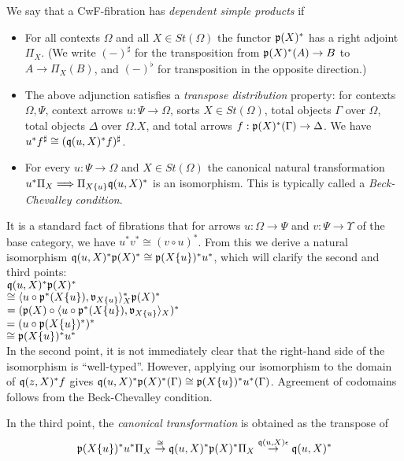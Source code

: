\documentclass[sigplan,10pt,review,anonymous]{acmart}
\begin{document}
We say that a CwF-fibration has \emph{dependent simple products} if 
\begin{itemize}
\item For all contexts $\Omega$ and all $X \in \mathit{St}(\Omega)$ the functor $\frak p (X)^*$ has a right adjoint $\Pi_{X}$. (We write $(-)^\sharp$ for the transposition from $\frak p(X)^*(A) \to B$ to $A \to \Pi_X(B)$, and $(-)^\flat$ for transposition in the opposite direction.)
\item The above adjunction satisfies a \emph{transpose distribution} property: for contexts $\Omega,\Psi$, context arrows $u : \Psi \to \Omega$, sorts $X \in \mathit{St}(\Omega)$, total objects $\Gamma$ over $\Omega$, total objects $\Delta$ over $\Omega . X$, and total arrows $f : \frak p(X)^*(\Gamma) \to \Delta$. We have $u^*f^\sharp \cong (\frak q(u, X)^* f)^\sharp$.
\item For every $u : \Psi \to \Omega$ and $X \in \mathit{St}(\Omega)$ the canonical natural transformation $u^* \Pi_{X} \Longrightarrow \Pi_{X \{ u \}} \frak q(u, X)^*$ is an isomorphism. This is typically called a \emph{Beck-Chevalley condition}.
\end{itemize}

It is a standard fact of fibrations that for arrows $u : \Omega \to \Psi$ and $v : \Psi \to \Upsilon$ of the base category, we have $u^*v^* \cong (v \circ u)^*$. From this we derive a natural isomorphism $\frak q(u,X)^* \frak p(X)^* \cong \frak p(X \{ u \})^* u^*$, which will clarify the second and third points:\\

$\frak q(u,X)^* \frak p(X)^*$\\
$\cong \langle u \circ \frak p^*(X \{ u \}), \frak v_{X \{ u \}} \rangle_X^* \frak p(X)^*$\\
$= (\frak p(X) \circ \langle u \circ \frak p^*(X \{ u \}), \frak v_{X \{ u \}} \rangle_X)^*$\\
$= (u \circ \frak p(X \{ u \})^*)^*$\\
$\cong \frak p(X \{ u \})^* u^*$\\

In the second point, it is not immediately clear that the right-hand side of the isomorphism is ``well-typed''. However, applying our isomorphism to the domain of $\frak q(z, X)^* f$ gives $\frak q(u,X)^* \frak p(X)^*(\Gamma) \cong \frak p(X \{ u \})^* u^*(\Gamma)$. Agreement of codomains follows from the Beck-Chevalley condition.

In the third point, the \emph{canonical transformation} is obtained as the transpose of
$$\frak p(X \{u \})^* u^* \Pi_X \overset{\cong}{\to} \frak q(u,X)^* \frak p(X)^* \Pi_X \overset{\frak q(u,X) \epsilon}{\to} \frak q(u,X)^*$$
\end{document}
